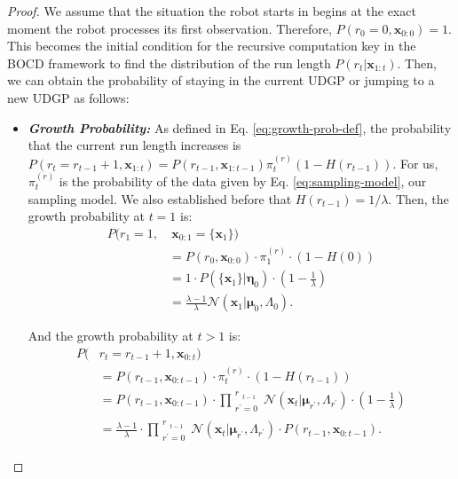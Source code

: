 \documentclass[10pt,a4paper]{amsart}
\begin{document}
\begin{proof} We assume that the situation the robot starts in begins at the exact moment the robot processes its first observation. Therefore, $P(r_0 = 0, \boldsymbol{x}_{0:0}) = 1$. This becomes the initial condition for the recursive computation key in the BOCD framework to find the distribution of the run length $P(r_t | \boldsymbol{x}_{1:t})$. Then, we can obtain the probability of staying in the current UDGP or jumping to a new UDGP as follows:

    \begin{itemize}[leftmargin=0.45cm]
        \item \textit{\textbf{Growth Probability:}} As defined in Eq. \eqref{eq:growth-prob-def}, the probability that the current run length increases is $P(r_t = r_{t-1}+1, \boldsymbol{x}_{1:t}) = P(r_{t-1}, \boldsymbol{x}_{1:t-1}) \pi_t^{(r)} (1 - H(r_{t-1}))$. For us, $\pi_t^{(r)}$ is the probability of the data given by Eq. \eqref{eq:sampling-model}, our sampling model. We also established before that $H(r_{t-1}) = 1 / \lambda$. Then, the growth probability at $t=1$ is:
        \begin{align*}
            P(r_1 = 1,&~\boldsymbol{x}_{0:1} = \{\boldsymbol{x}_1\}) \\&= P(r_0, \boldsymbol{x}_{0:0}) \cdot \pi_1^{(r)} \cdot (1 - H(0)) \nonumber \\
            &= 1 \cdot P(\{\boldsymbol{x}_1\} | \boldsymbol{\eta}_0) \cdot (1 - \frac{1}{\lambda}) \nonumber \\
            &= \frac{\lambda - 1}{\lambda} \mathcal{N}(\boldsymbol{x}_1 | \boldsymbol{\mu}_0, \Lambda_0). \nonumber
        \end{align*}

        And the growth probability at $t > 1$ is:
        \begin{align*}
            P(&r_t=r_{t-1}+1, \boldsymbol{x}_{0:t}) \\&= P(r_{t-1}, \boldsymbol{x}_{0:t-1}) \cdot \pi_t^{(r)} \cdot (1 - H(r_{t-1})) \nonumber \\
            &= P(r_{t-1}, \boldsymbol{x}_{0:t-1}) \cdot \prod_{\substack{r^\prime = 0}}^{\substack{r}_{t-1}} \mathcal{N} (\boldsymbol{x}_t | \boldsymbol{\mu}_{r^\prime}, \Lambda_{r^\prime}) \cdot (1 - \frac{1}{\lambda}) \nonumber \\
            &= \frac{\lambda - 1}{\lambda} \cdot \prod_{\substack{r^\prime = 0}}^{\substack{r}_{t-1}} \mathcal{N} (\boldsymbol{x}_t | \boldsymbol{\mu}_{r^\prime}, \Lambda_{r^\prime}) \cdot P(r_{t-1}, \boldsymbol{x}_{0:t-1}). \nonumber
        \end{align*}


\end{itemize}
\end{proof}
\end{document}
